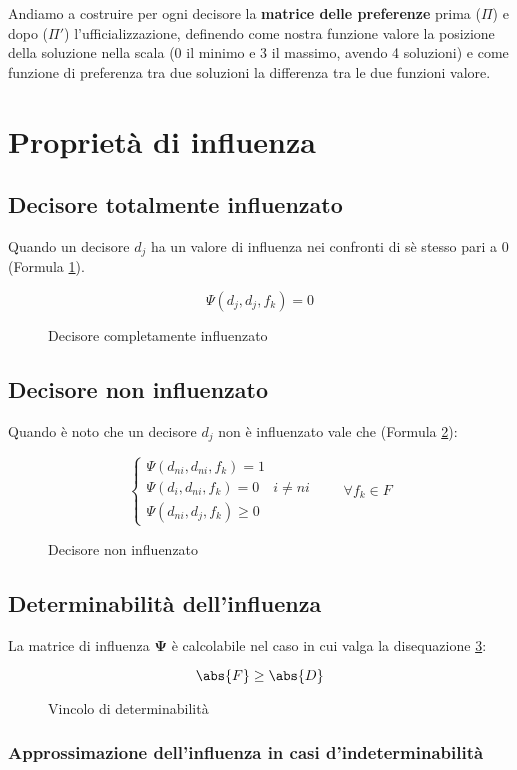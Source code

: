 \documentclass[\main/main.tex]{subfiles}
\begin{document}
Andiamo a costruire per ogni decisore la \textbf{matrice delle preferenze} prima ($\Pi$) e dopo ($\Pi'$) l'ufficializzazione, definendo come nostra funzione valore la posizione della soluzione nella scala (0 il minimo e 3 il massimo, avendo 4 soluzioni) e come funzione di preferenza tra due soluzioni la differenza tra le due funzioni valore.

\clearpage

\section{Proprietà di influenza}
\subsection{Decisore totalmente influenzato}
Quando un decisore $d_j$ ha un valore di influenza nei confronti di sè stesso pari a 0 (Formula \ref{decisore_influenzato}).

\begin{figure}
	\[
		\Psi(d_j, d_j, f_k) = 0
	\]
	\caption{Decisore completamente influenzato}
	\label{decisore_influenzato}
\end{figure}

\subsection{Decisore non influenzato}
Quando è noto che un decisore $d_j$ non è influenzato vale che (Formula \ref{decisore_non_influenzato}):

\begin{figure}
	\[
		\begin{cases}
			\Psi(d_{ni}, d_{ni}, f_k) = 1             \\
			\Psi(d_i, d_{ni}, f_k) = 0 \quad i\neq ni \\
			\Psi(d_{ni}, d_j, f_k) \geq 0
		\end{cases}
		\qquad \forall f_k \in F
	\]
	\caption{Decisore non influenzato}
	\label{decisore_non_influenzato}
\end{figure}

\subsection{Determinabilità dell'influenza}
La matrice di influenza $\bm{\Psi}$ è calcolabile nel caso in cui valga la disequazione \ref{influenza_determinabile}:


\begin{figure}
	\[
		\abs{F} \geq \abs{D}
	\]
	\caption{Vincolo di determinabilità}
	\label{influenza_determinabile}
\end{figure}



\subsubsection{Approssimazione dell'influenza in casi d'indeterminabilità}
\end{document}
